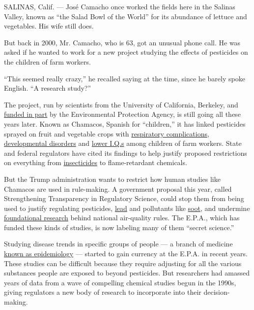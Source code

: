 SALINAS, Calif. --- José Camacho once worked the fields here in the
Salinas Valley, known as ``the Salad Bowl of the World'' for its
abundance of lettuce and vegetables. His wife still does.

But back in 2000, Mr. Camacho, who is 63, got an unusual phone call. He
was asked if he wanted to work for a new project studying the effects of
pesticides on the children of farm workers.

``This seemed really crazy,'' he recalled saying at the time, since he
barely spoke English. ``A research study?''

The project, run by scientists from the University of California,
Berkeley, and
\href{https://cfpub.epa.gov/ncer_abstracts/index.cfm/fuseaction/display.abstractDetail/abstract/9234/report/2015}{funded
in part} by the Environmental Protection Agency, is still going all
these years later. Known as Chamacos, Spanish for ``children,'' it has
linked pesticides sprayed on fruit and vegetable crops with
\href{https://www.ncbi.nlm.nih.gov/pubmed/26634937}{respiratory
complications},
\href{https://onlinelibrary.wiley.com/doi/epdf/10.1111/j.1742-7843.2007.00171.x}{developmental
disorders} and \href{https://www.ncbi.nlm.nih.gov/pubmed/28557711}{lower
I.Q.s} among children of farm workers. State and federal regulators have
cited its findings to help justify proposed restrictions on everything
from
\href{https://www.regulations.gov/document?D=EPA-HQ-OPP-2015-0653-0454}{insecticides}
to flame-retardant chemicals.

But the Trump administration wants to restrict how human studies like
Chamacos are used in rule-making. A government proposal this year,
called Strengthening Transparency in Regulatory Science, could stop them
from being used to justify regulating pesticides,
\href{http://www.sciencemag.org/news/2018/05/epa-s-secret-science-rule-could-undermine-agency-s-war-lead}{lead}
and pollutants like
\href{https://insideclimatenews.org/news/22032018/epa-air-pollution-soot-rules-scott-pruitt-secret-science-policy-health-regulations}{soot},
and undermine
\href{https://www.hsph.harvard.edu/news/features/six-cities-air-pollution-study-turns-20/}{foundational
research} behind national air-quality rules. The E.P.A., which has
funded these kinds of studies, is now labeling many of them ``secret
science.''

Studying disease trends in specific groups of people --- a branch of
medicine
\href{https://www.cdc.gov/ophss/csels/dsepd/ss1978/lesson1/section2.html}{known
as epidemiology} --- started to gain currency at the E.P.A. in recent
years. These studies can be difficult because they require adjusting for
all the various substances people are exposed to beyond pesticides. But
researchers had amassed years of data from a wave of compelling chemical
studies begun in the 1990s, giving regulators a new body of research to
incorporate into their decision-making.

